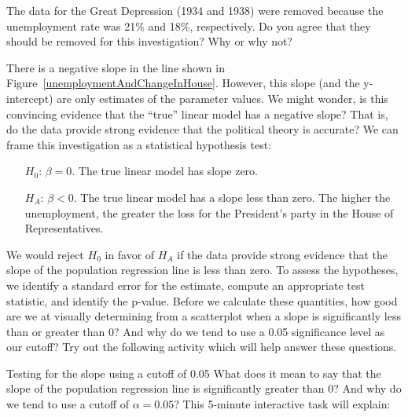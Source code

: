 \D{\newpage}

\begin{exercisewrap}
\begin{nexercise}
The data for the Great Depression (1934 and 1938) were removed because the unemployment rate was 21\% and 18\%, respectively. Do you agree that they should be removed for this investigation? Why or why not?\footnotemark 
\end{nexercise}
\end{exercisewrap}

There is a negative slope in the line shown in Figure~\ref{unemploymentAndChangeInHouse}. However, this slope (and the y-intercept) are only estimates of the parameter values. We might wonder, is this convincing evidence that the ``true'' linear model has a negative slope? That is, do the data provide strong evidence that the political theory is accurate?  We can frame this investigation as a statistical hypothesis test:
\begin{itemize}
\item[$H_0$:] $\beta = 0$. The true linear model has slope zero.
\item[$H_A$:] $\beta < 0$. The true linear model has a slope less than zero. The higher the unemployment, the greater the loss for the President's party in the House of Representatives.
\end{itemize}
We would reject $H_0$ in favor of $H_A$ if the data provide strong evidence that the slope of the population regression line is less than zero. To assess the hypotheses, we identify a standard error for the estimate, compute an appropriate test statistic, and identify the p-value.
Before we calculate these quantities, how good are we at visually determining from a scatterplot when a slope is significantly less than or greater than 0?  And why do we tend to use a 0.05 significance level as our cutoff?  Try out the following activity which will help answer these questions.

\begin{onebox}{Testing for the slope using a cutoff of 0.05}
  What does it mean to say that the slope of the population regression line is significantly greater than 0?  And why do we tend to use a cutoff of $\alpha = 0.05$?   
  This 5-minute interactive task will explain: 
  \begin{center}
  \end{center}
\end{onebox}


